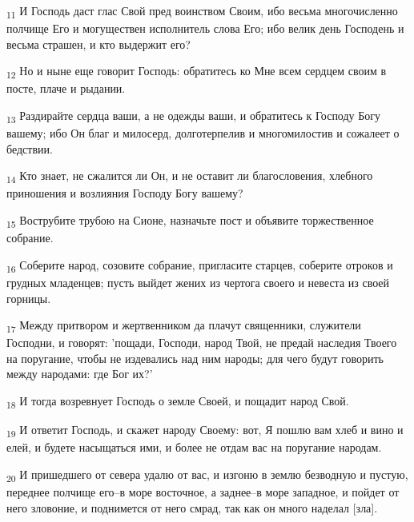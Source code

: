 \begin{tcolorbox}
\textsubscript{11} И Господь даст глас Свой пред воинством Своим, ибо весьма многочисленно полчище Его и могуществен исполнитель слова Его; ибо велик день Господень и весьма страшен, и кто выдержит его?
\end{tcolorbox}
\begin{tcolorbox}
\textsubscript{12} Но и ныне еще говорит Господь: обратитесь ко Мне всем сердцем своим в посте, плаче и рыдании.
\end{tcolorbox}
\begin{tcolorbox}
\textsubscript{13} Раздирайте сердца ваши, а не одежды ваши, и обратитесь к Господу Богу вашему; ибо Он благ и милосерд, долготерпелив и многомилостив и сожалеет о бедствии.
\end{tcolorbox}
\begin{tcolorbox}
\textsubscript{14} Кто знает, не сжалится ли Он, и не оставит ли благословения, хлебного приношения и возлияния Господу Богу вашему?
\end{tcolorbox}
\begin{tcolorbox}
\textsubscript{15} Вострубите трубою на Сионе, назначьте пост и объявите торжественное собрание.
\end{tcolorbox}
\begin{tcolorbox}
\textsubscript{16} Соберите народ, созовите собрание, пригласите старцев, соберите отроков и грудных младенцев; пусть выйдет жених из чертога своего и невеста из своей горницы.
\end{tcolorbox}
\begin{tcolorbox}
\textsubscript{17} Между притвором и жертвенником да плачут священники, служители Господни, и говорят: 'пощади, Господи, народ Твой, не предай наследия Твоего на поругание, чтобы не издевались над ним народы; для чего будут говорить между народами: где Бог их?'
\end{tcolorbox}
\begin{tcolorbox}
\textsubscript{18} И тогда возревнует Господь о земле Своей, и пощадит народ Свой.
\end{tcolorbox}
\begin{tcolorbox}
\textsubscript{19} И ответит Господь, и скажет народу Своему: вот, Я пошлю вам хлеб и вино и елей, и будете насыщаться ими, и более не отдам вас на поругание народам.
\end{tcolorbox}
\begin{tcolorbox}
\textsubscript{20} И пришедшего от севера удалю от вас, и изгоню в землю безводную и пустую, переднее полчище его--в море восточное, а заднее--в море западное, и пойдет от него зловоние, и поднимется от него смрад, так как он много наделал [зла].
\end{tcolorbox}
